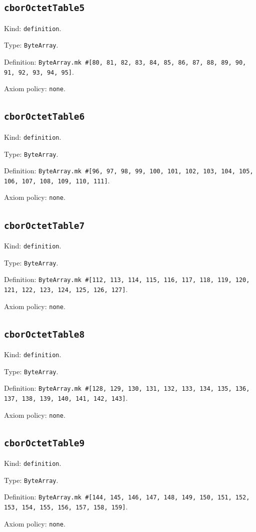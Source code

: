 \documentclass[11pt]{article}
\begin{document}
\subsection*{\texttt{cborOctetTable5}}
\noindent Kind: \texttt{definition}.\par
\noindent Type: \texttt{ByteArray}.\par
\noindent Definition: \texttt{ByteArray.mk \#[80, 81, 82, 83, 84, 85, 86, 87, 88, 89, 90, 91, 92, 93, 94, 95]}.\par
\noindent Axiom policy: \texttt{none}.\par
\subsection*{\texttt{cborOctetTable6}}
\noindent Kind: \texttt{definition}.\par
\noindent Type: \texttt{ByteArray}.\par
\noindent Definition: \texttt{ByteArray.mk \#[96, 97, 98, 99, 100, 101, 102, 103, 104, 105, 106, 107, 108, 109, 110, 111]}.\par
\noindent Axiom policy: \texttt{none}.\par
\subsection*{\texttt{cborOctetTable7}}
\noindent Kind: \texttt{definition}.\par
\noindent Type: \texttt{ByteArray}.\par
\noindent Definition: \texttt{ByteArray.mk \#[112, 113, 114, 115, 116, 117, 118, 119, 120, 121, 122, 123, 124, 125, 126, 127]}.\par
\noindent Axiom policy: \texttt{none}.\par
\subsection*{\texttt{cborOctetTable8}}
\noindent Kind: \texttt{definition}.\par
\noindent Type: \texttt{ByteArray}.\par
\noindent Definition: \texttt{ByteArray.mk \#[128, 129, 130, 131, 132, 133, 134, 135, 136, 137, 138, 139, 140, 141, 142, 143]}.\par
\noindent Axiom policy: \texttt{none}.\par
\subsection*{\texttt{cborOctetTable9}}
\noindent Kind: \texttt{definition}.\par
\noindent Type: \texttt{ByteArray}.\par
\noindent Definition: \texttt{ByteArray.mk \#[144, 145, 146, 147, 148, 149, 150, 151, 152, 153, 154, 155, 156, 157, 158, 159]}.\par
\noindent Axiom policy: \texttt{none}.\par
\end{document}
